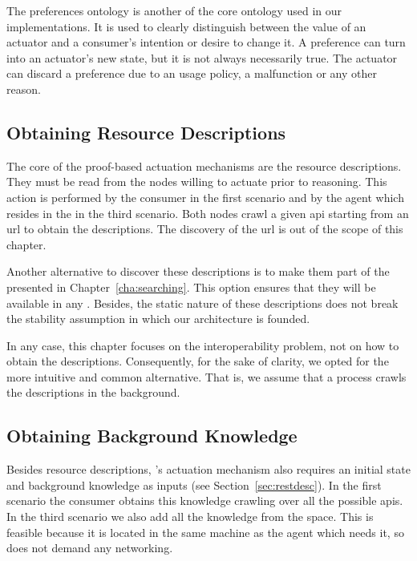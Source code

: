 The preferences ontology is another of the core ontology used in our implementations.
It is used to clearly distinguish between the value of an actuator and a consumer's intention or desire to change it.
A preference can turn into an actuator's new state, but it is not always necessarily true.
The actuator can discard a preference due to an usage policy, a malfunction or any other reason.




\subsection{Obtaining Resource Descriptions}

The core of the proof-based actuation mechanisms are the resource descriptions.
They must be read from the nodes willing to actuate prior to reasoning. %
This action is performed by the consumer in the first scenario and by the agent which resides in the \Space{} in the third scenario.
Both nodes crawl a given \ac{api} starting from an \ac{url} to obtain the descriptions.
The discovery of the \ac{url} is out of the scope of this chapter.


Another alternative to discover these descriptions is to make them part of the \clues{} presented in Chapter~\ref{cha:searching}.
This option ensures that they will be available in any \consumer{}.
Besides, the static nature of these descriptions does not break the \clues{} stability assumption in which our architecture is founded. %


In any case, this chapter focuses on the interoperability problem, not on how to obtain the descriptions.
Consequently, for the sake of clarity, we opted for the more intuitive and common alternative. %
That is, we assume that a process crawls the descriptions in the background.



\subsection{Obtaining Background Knowledge}

Besides resource descriptions, \citeauthor{verborgh_ijcs_2014}'s actuation mechanism also requires an initial state and background knowledge as inputs (see Section~\ref{sec:restdesc}).
In the first scenario the consumer obtains this knowledge crawling over all the possible \acsp{api}.
In the third scenario we also add all the knowledge from the space.
This is feasible because it is located in the same machine as the agent which needs it, so does not demand any networking. %


